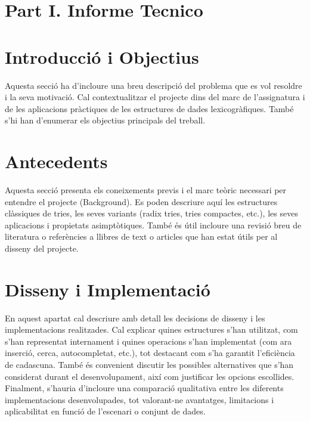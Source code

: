 \section*{\centering Part I. Informe Tecnico}

\section{Introducció i Objectius}

Aquesta secció ha d’incloure una breu descripció del problema que es vol resoldre i la seva motivació. Cal contextualitzar el projecte dins del marc de l'assignatura i de les aplicacions pràctiques de les estructures de dades lexicogràfiques. També s’hi han d’enumerar els objectius principals del treball.

\section{Antecedents}

Aquesta secció presenta els coneixements previs i el marc teòric necessari per entendre el projecte (Background). Es poden descriure aquí les estructures clàssiques de tries, les seves variants (radix tries, tries compactes, etc.), les seves aplicacions i propietats asimptòtiques. També és útil incloure una revisió breu de literatura o referències a llibres de text o articles que han estat útils per al disseny del projecte.

\section{Disseny i Implementació}

En aquest apartat cal descriure amb detall les decisions de disseny i les implementacions realitzades. Cal explicar quines estructures s’han utilitzat, com s’han representat internament i quines operacions s’han implementat (com ara inserció, cerca, autocompletat, etc.), tot destacant com s’ha garantit l’eficiència de cadascuna. També és convenient discutir les possibles alternatives que s’han considerat durant el desenvolupament, així com justificar les opcions escollides. Finalment, s’hauria d’incloure una comparació qualitativa entre les diferents implementacions desenvolupades, tot valorant-ne avantatges, limitacions i aplicabilitat en funció de l’escenari o conjunt de dades.

